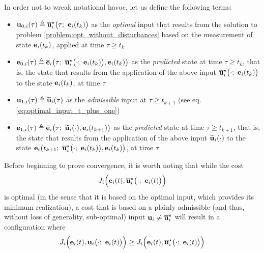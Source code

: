 In order not to wreak notational havoc, let us define the following terms:
\begin{gg_box}
\begin{itemize}
  \item $\bm{\mathbf{u}}_{0,i}(\tau) \triangleq \overline{\bm{\mathbf{u}}}_i^{\star}\big(\tau;\ \bm{\mathbf{e}}_i(t_k)\big)$
    as the \textit{optimal} input that results from the solution to problem
    \eqref{problem:opt_without_disturbances} based on the measurement of state
    $\bm{\mathbf{e}}_i(t_k)$, applied at time $\tau \geq t_k$
  \item $\vect{e}_{0,i}(\tau) \triangleq \overline{\vect{e}}_i\big(\tau;\ \overline{\vect{u}}_i^{\star}\big(\cdot;\ \vect{e}_i(t_k)\big), \vect{e}_i(t_k)\big)$
    as the \textit{predicted} state at time $\tau \geq t_k$, that is,
    the state that results from the application of the above input
    $\overline{\vect{u}}_i^{\star}\big(\cdot;\ \vect{e}_i(t_k)\big)$ to the
    state $\bm{\mathbf{e}}_i(t_k)$, at time $\tau$
  \item $\bm{\mathbf{u}}_{1,i}(\tau) \triangleq \widetilde{\bm{\mathbf{u}}}_i(\tau)$
    as the \textit{admissible} input at $\tau \geq t_{k+1}$ (see eq. \eqref{eq:optimal_input_t_plus_one})
  \item $\bm{\mathbf{e}}_{1,i}(\tau) \triangleq \overline{\bm{\mathbf{e}}}_i\big(\tau;\ \widetilde{\bm{\mathbf{u}}}_i(\cdot), \bm{\mathbf{e}}_i(t_{k+1})\big)$
    as the \textit{predicted} state at time $\tau \geq t_{k+1}$, that is,
    the state that results from the application of the above input
    $\widetilde{\bm{\mathbf{u}}}_i(\cdot)$ to the state
    $\vect{e}_i\big(t_{k+1};\ \overline{\vect{u}}_i^{\star}\big(\cdot;\ \vect{e}_i(t_k)\big), \vect{e}_i(t_k)\big)$, at time $\tau$
\end{itemize}
\end{gg_box}





Before beginning to prove convergence, it is worth noting that while the cost
$$J_i \Big(\vect{e}_i(t), \overline{\vect{u}}_i^{\star}\big(\cdot;\ \vect{e}_i(t)\big)\Big)$$
is optimal (in the sense that it is based on the optimal input, which provides
its minimum realization), a cost that is based on a plainly admissible
(and thus, without loss of generality, sub-optimal) input
$\bm{\mathbf{u}}_i \not= \overline{\bm{\mathbf{u}}}_i^{\star}$ will result in a configuration where
\begin{equation}
J_i \Big(\vect{e}_i(t), \vect{u}_i\big(\cdot;\ \vect{e}_i(t)\big)\Big)
\geq J_i \Big(\vect{e}_i(t), \overline{\vect{u}}_i^{\star}\big(\cdot;\ \vect{e}_i(t)\big)\Big)
\end{equation}

